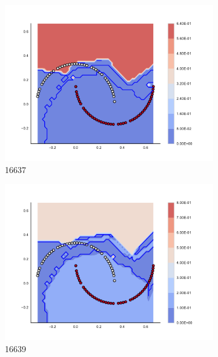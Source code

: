 \begin{figure}[h]
\begin{subfigure}[b]{0.09\textwidth}
    \includegraphics[clip, trim=2.35cm 1.75cm 4.5cm 0cm,width=\textwidth]{img/convergence/16637.pdf}
    \caption{16637}
    \label{fig:convergence_16637}
\end{subfigure}
%
\begin{subfigure}[b]{0.09\textwidth}
    \includegraphics[clip, trim=2.35cm 1.75cm 4.5cm 0cm,width=\textwidth]{img/convergence/16639.pdf}
    \caption{16639}
    \label{fig:convergence_16639}
\end{subfigure}
%
\begin{subfigure}[b]{0.09\textwidth}

\end{subfigure}
\end{figure}
